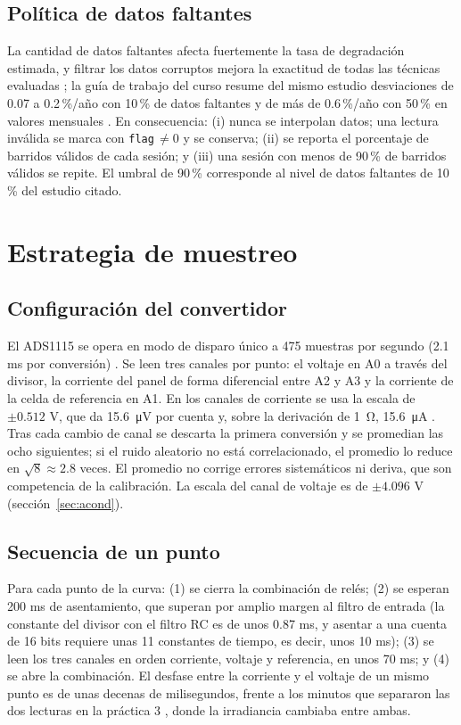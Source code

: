 \documentclass[10pt,letterpaper,twocolumn]{article}
\begin{document}
\subsection{Política de datos faltantes}\label{sec:faltantes}
La cantidad de datos faltantes afecta fuertemente la tasa de degradación estimada, y filtrar los datos corruptos mejora la exactitud de todas las técnicas evaluadas \cite{romero}; la guía de trabajo del curso resume del mismo estudio desviaciones de 0.07 a 0.2\,\%/año con 10\,\% de datos faltantes y de más de 0.6\,\%/año con 50\,\% en valores mensuales \cite{guia}. En consecuencia: (i) nunca se interpolan datos; una lectura inválida se marca con \texttt{flag}\,$\neq 0$ y se conserva; (ii) se reporta el porcentaje de barridos válidos de cada sesión; y (iii) una sesión con menos de 90\,\% de barridos válidos se repite. El umbral de 90\,\% corresponde al nivel de datos faltantes de 10\,\% del estudio citado.

\section{Estrategia de muestreo}\label{sec:muestreo}
\subsection{Configuración del convertidor}
El ADS1115 se opera en modo de disparo único a 475 muestras por segundo (2.1 ms por conversión) \cite{ads1115}. Se leen tres canales por punto: el voltaje en A0 a través del divisor, la corriente del panel de forma diferencial entre A2 y A3 y la corriente de la celda de referencia en A1. En los canales de corriente se usa la escala de $\pm 0.512$ V, que da \SI{15.6}{\micro\volt} por cuenta y, sobre la derivación de \SI{1}{\ohm}, \SI{15.6}{\micro\ampere} \cite{avance1}. Tras cada cambio de canal se descarta la primera conversión y se promedian las ocho siguientes; si el ruido aleatorio no está correlacionado, el promedio lo reduce en $\sqrt{8}\approx 2.8$ veces. El promedio no corrige errores sistemáticos ni deriva, que son competencia de la calibración. La escala del canal de voltaje es de $\pm 4.096$ V (sección~\ref{sec:acond}).

\subsection{Secuencia de un punto}
Para cada punto de la curva: (1) se cierra la combinación de relés; (2) se esperan 200 ms de asentamiento, que superan por amplio margen al filtro de entrada (la constante del divisor con el filtro RC es de unos 0.87 ms, y asentar a una cuenta de 16 bits requiere unas 11 constantes de tiempo, es decir, unos 10 ms); (3) se leen los tres canales en orden corriente, voltaje y referencia, en unos 70 ms; y (4) se abre la combinación. El desfase entre la corriente y el voltaje de un mismo punto es de unas decenas de milisegundos, frente a los minutos que separaron las dos lecturas en la práctica 3 \cite{lab3}, donde la irradiancia cambiaba entre ambas.
\end{document}
